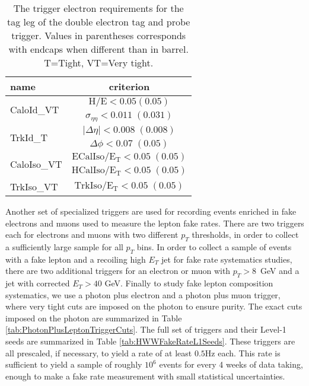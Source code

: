 \begin{table}[htb]
 \caption{The trigger electron requirements for the tag leg of the double electron 
tag and probe trigger. Values in parentheses corresponds with endcaps when 
different than in barrel. T=Tight, VT=Very tight.}
 \label{tab:HLTVeryTightElectronCuts}
 \centering
 \begin{tabular}{|l||c|}
   \hline
   name                       &  criterion \\
   \hline \hline
   \multirow{2}{*}{CaloId\_VT} & $\mathrm{H/E < 0.05 (0.05) }$ \\
                               & $\sigma_{\eta\eta}\mathrm{< 0.011\;(0.031)}$ \\
    \hline
    \multirow{2}{*}{TrkId\_T} & $|\Delta\eta|\mathrm{< 0.008\; (0.008)}$ \\
                               & $\Delta\phi\mathrm{< 0.07\;(0.05)}$  \\
    \hline
    \multirow{2}{*}{CaloIso\_VT} & $\mathrm{ECalIso/E_T <0.05\;(0.05)}$ \\
                                 & $\mathrm{HCalIso/E_T <0.05\;(0.05)}$ \\    
    \hline
    TrkIso\_VT                   & $\mathrm{TrkIso/E_T <0.05\;(0.05)}$ \\

   \hline
 \end{tabular}
\end{table}


Another set of specialized triggers are used for recording events
enriched in fake electrons and muons used to measure the lepton fake 
rates. There are two triggers each for electrons and muons with two 
different $p_{T}$ thresholds, in order to collect a sufficiently 
large sample for all $p_{T}$ bins. In order to collect a sample of
events with a fake lepton and a recoiling high $E_{T}$ jet for 
fake rate systematics studies, there are two additional 
triggers for an electron or muon with $p_{T} > 8$~GeV and a jet
with corrected $E_{T}>40$ GeV. Finally to study fake lepton composition
systematics, we use a photon plus electron and a photon plus muon
trigger, where very tight cuts are imposed on the photon to ensure purity. 
The exact cuts imposed on the photon are summarized in 
Table \ref{tab:PhotonPlusLeptonTriggerCuts}.
The full set of triggers and their Level-1 seeds are summarized in 
Table \ref{tab:HWWFakeRateL1Seeds}. These triggers are all prescaled, 
if necessary, to yield a rate of at  least $0.5$Hz each. This rate is 
sufficient to yield a sample of roughly $10^{6}$ events for every 4 
weeks of data taking, enough to make a fake rate measurement with 
small statistical uncertainties. 


